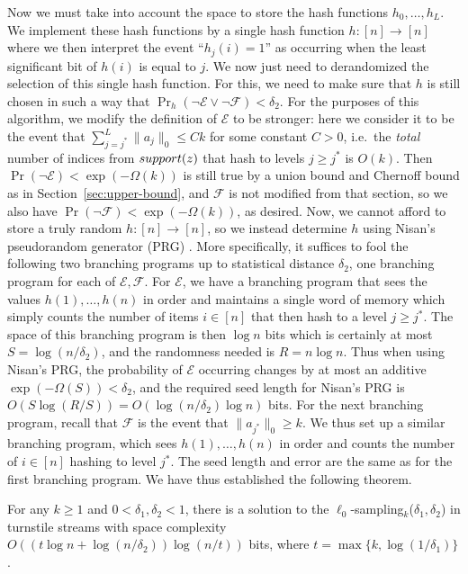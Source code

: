 Now we must take into account the space to store the hash functions $h_0,\ldots,h_L$. We implement these hash functions by a single hash function $h:[n]\rightarrow[n]$ where we then interpret the event ``$h_j(i) = 1$'' as occurring when the least significant bit of $h(i)$ is equal to $j$. We now just need to derandomized the selection of this single hash function. For this, we need to make sure that $h$ is still chosen in such a way that $\Pr_h(\neg\mathcal E \vee \neg\mathcal F) < \delta_2$. For the purposes of this algorithm, we modify the definition of $\mathcal E$ to be stronger: here we consider it to be the event that $\sum_{j=j^*}^L \|a_j\|_0 \le Ck$ for some constant $C>0$, i.e.\ the {\em total} number of indices from $\mathop{support}(z)$ that hash to levels $j\ge j^*$ is $O(k)$. Then $\Pr(\neg \mathcal E) < \exp(-\Omega(k))$ is still true by a union bound and Chernoff bound as in Section~\ref{sec:upper-bound}, and $\mathcal F$ is not modified from that section, so we also have $\Pr(\neg\mathcal F) < \exp(-\Omega(k))$, as desired. Now, we cannot afford to store a truly random $h:[n]\rightarrow[n]$, so we instead determine $h$ using Nisan's pseudorandom generator (PRG) \cite{Nisan92}. More specifically, it suffices to fool the following two branching programs up to statistical distance $\delta_2$, one branching program for each of $\mathcal E, \mathcal F$. For $\mathcal E$, we have a branching program that sees the values $h(1),\ldots,h(n)$ in order and maintains a single word of memory which simply counts the number of items $i\in[n]$ that then hash to a level $j\ge j^*$. The space of this branching program is then $\log n$ bits which is certainly at most $S = \log(n/\delta_2)$, and the randomness needed is $R = n\log n$. Thus when using Nisan's PRG, the probability of $\mathcal E$ occurring changes by at most an additive $\exp(-\Omega(S)) < \delta_2$, and the required seed length for Nisan's PRG is $O(S\log(R/S)) = O(\log(n/\delta_2)\log n)$ bits. For the next branching program, recall that $\mathcal F$ is the event that $\|a_{j^*}\|_0 \ge k$. We thus set up a similar branching program, which sees $h(1),\ldots,h(n)$ in order and counts the number of $i\in[n]$ hashing to level $j^*$. The seed length and error are the same as for the first branching program. We have thus established the following theorem.

\begin{theorem}
For any $k\ge 1$ and $0<\delta_1,\delta_2<1$, there is a solution to the $\ell_0$-sampling$_k$($\delta_1,\delta_2$) in turnstile streams with space complexity $O((t\log n + \log(n/\delta_2))\log(n/t))$ bits, where $t = \max\{k, \log(1/\delta_1)\}$.
\end{theorem}